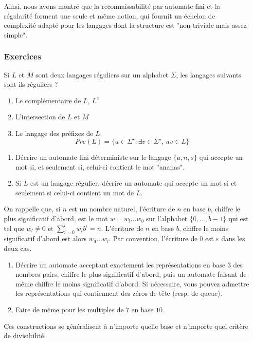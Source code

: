 Ainsi, nous avons montré que la reconnaissabilité par automate fini et la régularité forment une seule et même notion, qui fournit un échelon de complexité adapté pour les langages dont la structure est "non-triviale mais assez simple".


\subsubsection{Exercices}


\begin{exo}
Si $L$ et $M$ sont deux langages réguliers sur un alphabet $\Sigma$, les langages suivants sont-ils réguliers ?
\begin{enumerate}
\item Le complémentaire de $L$, $L^c$
\item L'intersection de $L$ et $M$
\item Le langage des préfixes de $L$,
$$Pre(L) = \{u\in\Sigma^\star : \exists v\in\Sigma^\star ,\, uv\in L\}$$
\end{enumerate}
\end{exo}


\begin{exo}
\begin{enumerate}
\item Décrire un automate fini déterministe sur le langage $\{a, n, s\}$ qui accepte un mot si, et seulement si, celui-ci contient le mot "ananas".
\item Si $L$ est un langage régulier, décrire un automate qui accepte un mot si et seulement si celui-ci contient un mot de $L$.
\end{enumerate}
\end{exo}


\begin{exo}
On rappelle que, si $n$ est un nombre naturel, l'écriture de $n$ en base $b$, chiffre le plus significatif d'abord, est le mot $w = w_l\dots w_0$ sur l'alphabet $\{0, \dots, b-1\}$ qui est tel que $w_l\ne 0$ et $\sum_{i = 0}^l w_ib^i = n$. L'écriture de $n$ en base $b$, chiffre le moins significatif d'abord est alors $w_0\dots w_l$. Par convention, l'écriture de 0 est $\varepsilon$ dans les deux cas.

\begin{enumerate}
\item Décrire un automate acceptant exactement les représentations en base $3$ des nombres pairs, chiffre le plus significatif d'abord, puis un automate faisant de même chiffre le moins significatif d'abord. Si nécessaire, vous pouvez admettre les représentations qui contiennent des zéros de tête (resp. de queue).
\item Faire de même pour les multiples de $7$ en base $10$.
\end{enumerate}

Ces constructions se généralisent à n'importe quelle base et n'importe quel critère de divisibilité.
\end{exo}


